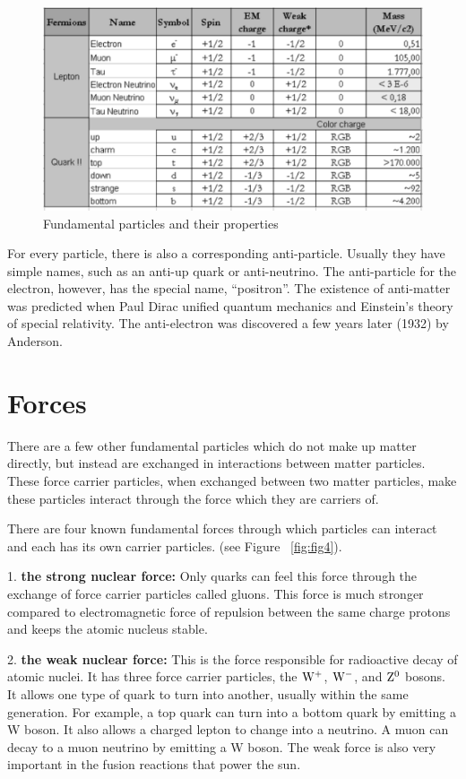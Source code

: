 \begin{figure}[h]
\centering\includegraphics[scale=0.5]{./ElementaryParticles/Pictures/fig5.pdf}
\caption{Fundamental particles and their properties}
\label{fig:fig5}
\end{figure}


For every particle, there is also a corresponding anti-particle.  Usually they have simple names, such as an anti-up quark or anti-neutrino.  The anti-particle for the electron, however, has the special name, “positron”.  The existence of anti-matter was predicted when Paul Dirac unified quantum mechanics and Einstein's theory of special relativity.  The anti-electron was discovered a few years later (1932) by Anderson.

\section{Forces} 
There are a few other fundamental particles which do not make up matter directly, but instead are exchanged in interactions between matter particles. These force carrier particles, when exchanged between two matter particles, make these particles interact through the force which they are carriers of. 

There are four known fundamental forces
through which particles can interact and each has its own carrier particles.
 (see Figure ~\ref{fig:fig4}). 

1.	{\bf the strong nuclear force:} 
Only quarks can feel this force through the exchange of force carrier particles called gluons. This force is much stronger compared to electromagnetic force of repulsion between the same charge protons and keeps the atomic nucleus stable.


2.	{\bf the weak nuclear force:}
This is the force responsible for radioactive decay of atomic nuclei.  It has three force carrier particles, 
the $\rm{W^+}$, $\rm{W^-}$, and $\rm{Z^0}$ bosons. It allows one type of quark to turn into another, usually within the same generation.  
For example, a top quark can turn into a bottom quark by emitting a W boson.  It also allows a charged lepton to change into a neutrino. A muon can decay to a muon neutrino by emitting a W boson.  The weak force is also very important in the fusion reactions that power the sun.

